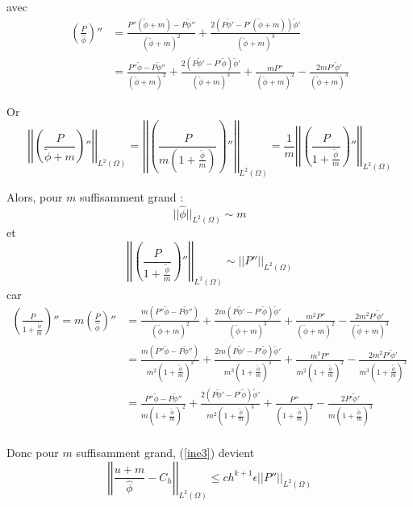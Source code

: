 avec
\begin{align*}
	\left(\frac{P}{\hat{\phi}}\right)''&=\frac{P''(\tilde{\phi}+m)-P\tilde{\phi}''}{(\tilde{\phi}+m)^2}+\frac{2(P\tilde{\phi}'-P'(\tilde{\phi}+m))\tilde{\phi}'}{(\tilde{\phi}+m)^3} \\
	&=\frac{P''\tilde{\phi}-P\tilde{\phi}''}{(\tilde{\phi}+m)^2}+\frac{2(P\tilde{\phi}'-P'\tilde{\phi})\tilde{\phi}'}{(\tilde{\phi}+m)^3}+    \frac{mP''}{(\tilde{\phi}+m)^2}-\frac{2mP'\tilde{\phi}'}{(\tilde{\phi}+m)^3}
\end{align*}

Or 
$$\left|\left|\left(\frac{P}{\tilde{\phi}+m}\right)''\right|\right|_{L^2(\Omega)}=\left|\left|\left(\frac{P}{m\left(1+\frac{\tilde{\phi}}{m}\right)}\right)''\right|\right|_{L^2(\Omega)}=\frac{1}{m}\left|\left|\left(\frac{P}{1+\frac{\tilde{\phi}}{m}}\right)''\right|\right|_{L^2(\Omega)}$$

Alors, pour $m$ suffisamment grand :
$$||\hat{\phi}||_{L^2(\Omega)}\sim m$$
et
$$\left|\left|\left(\frac{P}{1+\frac{\tilde{\phi}}{m}}\right)''\right|\right|_{L^2(\Omega)}\sim\left|\left|P''\right|\right|_{L^2(\Omega)}$$
car
\begin{align*}
	\left(\frac{P}{1+\frac{\tilde{\phi}}{m}}\right)''=m\left(\frac{P}{\hat{\phi}}\right)''&=\frac{m(P''\tilde{\phi}-P\tilde{\phi}'')}{(\tilde{\phi}+m)^2}+\frac{2m(P\tilde{\phi}'-P'\tilde{\phi})\tilde{\phi}'}{(\tilde{\phi}+m)^3}+    \frac{m^2P''}{(\tilde{\phi}+m)^2}-\frac{2m^2P'\tilde{\phi}'}{(\tilde{\phi}+m)^3} \\
	&=\frac{m(P''\tilde{\phi}-P\tilde{\phi}'')}{m^2\left(1+\frac{\tilde{\phi}}{m}\right)^2}+\frac{2m(P\tilde{\phi}'-P'\tilde{\phi})\tilde{\phi}'}{m^3\left(1+\frac{\tilde{\phi}}{m}\right)^3}+    \frac{m^2P''}{m^2\left(1+\frac{\tilde{\phi}}{m}\right)^2}-\frac{2m^2P'\tilde{\phi}'}{m^3\left(1+\frac{\tilde{\phi}}{m}\right)^3} \\
	&=\frac{P''\tilde{\phi}-P\tilde{\phi}''}{m\left(1+\frac{\tilde{\phi}}{m}\right)^2}+\frac{2(P\tilde{\phi}'-P'\tilde{\phi})\tilde{\phi}'}{m^2\left(1+\frac{\tilde{\phi}}{m}\right)^3}+    \frac{P''}{\left(1+\frac{\tilde{\phi}}{m}\right)^2}-\frac{2P'\tilde{\phi}'}{m\left(1+\frac{\tilde{\phi}}{m}\right)^3} \\
\end{align*}

Donc pour $m$ suffisamment grand, (\ref{ine3}) devient
\begin{equation}
	\left|\left|\frac{u+m}{\hat{\phi}}-C_h\right|\right|_{L^2(\Omega)}\le ch^{k+1}\epsilon\left|\left|P''\right|\right|_{L^2(\Omega)} \label{ine3_bis}
\end{equation}

